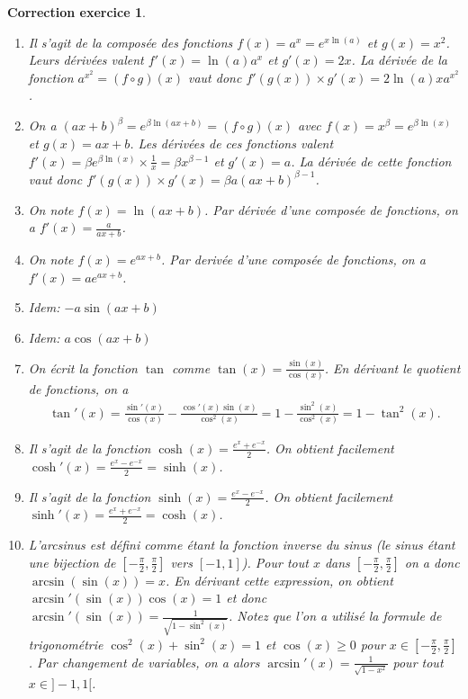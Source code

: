 \documentclass[12pt]{article}
\newtheorem{correction}{\bf Correction exercice}
\newenvironment{cor}{
\begin{correction}\smallskip\normalfont}{\end{correction}
}
\newif\ifcorrige\corrigefalse
\begin{document}
\ifcorrige
\color{magenta}
\begin{cor}
$\qquad$
\begin{enumerate}
\item Il s'agit de la compos\'ee des fonctions $f(x) = a^x = e^{x \ln(a)}$ et $g(x) = x^2$.
  Leurs d\'eriv\'ees valent $f'(x) = \ln(a) a^x$ et $g'(x) = 2x$.
  La d\'eriv\'ee de la fonction $a^{x^2} = (f \circ g)(x)$ vaut donc
  $f'(g(x)) \times g'(x) = 2 \ln(a) x a^{x^2}$.

\item On a $(ax+b)^{\beta} = e^{\beta \ln(ax+b) } = (f \circ g)(x)$
  avec $f(x) = x^{\beta} = e^{\beta \ln(x)}$ et $g(x) = ax+b$.
  Les d\'eriv\'ees de ces fonctions valent
  $f'(x) = \beta e^{\beta \ln(x)} \times \frac1x = \beta x^{\beta - 1}$
  et $g'(x) = a$.
  La d\'eriv\'ee de cette fonction vaut donc
  $f'(g(x)) \times g'(x) = \beta a (ax+b)^{\beta - 1}$.

\item On note $f(x) = \ln(ax+b)$.
  Par d\'eriv\'ee d'une compos\'ee de fonctions, on a $f'(x) = \frac{a}{ax+b}$.

\item On note $f(x) = e^{ax+b}$. Par deriv\'ee d'une compos\'ee de fonctions, on a
  $f'(x) = a e^{ax+b}$.

\item Idem:
  $- a \sin(ax+b)$

\item Idem: $a \cos(ax+b)$

\item On \'ecrit la fonction $\tan$ comme $\tan(x) = \frac{\sin(x)}{\cos(x)}$.
  En d\'erivant le quotient de fonctions, on a
  \begin{align*}
    \tan'(x) = \frac{\sin'(x)}{\cos(x)} - \frac{\cos'(x)\sin(x)}{\cos^2(x)}
    = 1 - \frac{\sin^2(x)}{\cos^2(x)} = 1 - \tan^2(x) .
  \end{align*}

\item Il s'agit de la fonction $\cosh(x) = \frac{e^x + e^{-x}}{2}$.
  On obtient facilement $\cosh'(x) = \frac{e^x - e^{-x}}{2} = \sinh(x)$.

\item Il s'agit de la fonction $\sinh(x) = \frac{e^x - e^{-x}}{2}$.
  On obtient facilement $\sinh'(x) = \frac{e^x + e^{-x}}{2} = \cosh(x)$.

\item L'arcsinus est d\'efini comme \'etant la fonction inverse du sinus
  (le sinus \'etant une bijection de $[-\frac{\pi}2,\frac{\pi}2]$ vers $[-1,1]$).
  Pour tout $x$ dans $[-\frac{\pi}2,\frac{\pi}2]$ on a donc $\arcsin(\sin(x)) = x$.
  En d\'erivant cette expression, on obtient
  $\arcsin'(\sin(x)) \cos(x) = 1$
  et donc
  $\arcsin'(\sin(x)) = \frac{1}{\sqrt{1-\sin^2(x)}}$.
  Notez que l'on a utilis\'e la formule de trigonom\'etrie $\cos^2(x) + \sin^2(x) = 1$
  et $\cos(x) \geq 0$ pour $x \in [-\frac{\pi}2,\frac{\pi}2]$.
  Par changement de variables, on a alors
  $\arcsin'(x) = \frac{1}{\sqrt{1-x^2}}$ pour tout $x \in ]-1,1[$.


\end{enumerate}
\end{cor}
\end{document}
